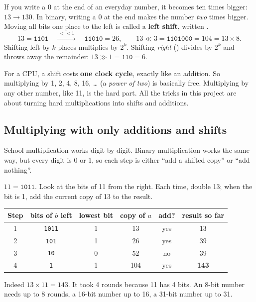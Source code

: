 If you write a 0 at the end of an everyday number, it becomes ten times bigger:
$13 \to 130$. In binary, writing a 0 at the end makes the number \emph{two} times bigger. Moving
all bits one place to the left is called a \textbf{left shift}, written \code{<<}.
\[
  13 = \texttt{1101}\quad\xrightarrow{\;<<1\;}\quad \texttt{11010} = 26,\qquad
  13 \ll 3 = \texttt{1101000} = 104 = 13\times 8.
\]
Shifting left by $k$ places multiplies by $2^k$. Shifting \emph{right} (\code{>>}) divides by
$2^k$ and throws away the remainder: $13 \gg 1 = \texttt{110} = 6$.

\begin{keyidea}
For a CPU, a shift costs \textbf{one clock cycle}, exactly like an addition. So multiplying by
1, 2, 4, 8, 16, \dots{} (a \emph{power of two}) is basically free. Multiplying by any other
number, like 11, is the hard part. All the tricks in this project are about turning hard
multiplications into shifts and additions.
\end{keyidea}

\subsection{Multiplying with only additions and shifts}\label{sec:shiftadd}

School multiplication works digit by digit. Binary multiplication works the same way, but every
digit is 0 or 1, so each step is either ``add a shifted copy'' or ``add nothing''.

\begin{example}
$11 = \texttt{1011}$. Look at the bits of 11 from the right. Each time, double 13; when the bit is 1,
add the current copy of 13 to the result.

\begin{center}
\begin{tabular}{cccccc}
\toprule
Step & bits of $b$ left & lowest bit & copy of $a$ & add? & result so far\\
\midrule
1 & \texttt{1011} & 1 & 13 & yes & 13\\
2 & \texttt{101}  & 1 & 26 & yes & 39\\
3 & \texttt{10}   & 0 & 52 & no  & 39\\
4 & \texttt{1}    & 1 & 104 & yes & \textbf{143}\\
\bottomrule
\end{tabular}
\end{center}
Indeed $13\times 11 = 143$. It took 4 rounds because 11 has 4 bits. An 8-bit number needs up to 8
rounds, a 16-bit number up to 16, a 31-bit number up to 31.
\end{example}

